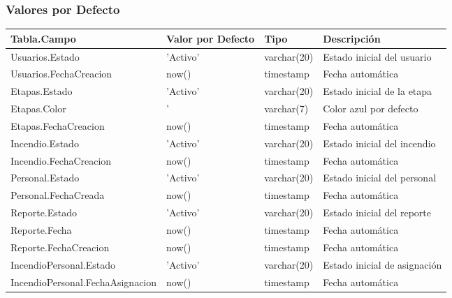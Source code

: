 \subsubsection{Valores por Defecto}
\begin{longtable}{|p{4cm}|p{3cm}|p{3cm}|p{3cm}|}
    \hline
    \textbf{Tabla.Campo} & \textbf{Valor por Defecto} & \textbf{Tipo} & \textbf{Descripción} \\ \hline
    Usuarios.Estado & 'Activo' & varchar(20) & Estado inicial del usuario \\ \hline
    Usuarios.FechaCreacion & now() & timestamp & Fecha automática \\ \hline
    Etapas.Estado & 'Activo' & varchar(20) & Estado inicial de la etapa \\ \hline
    Etapas.Color & '#007bff' & varchar(7) & Color azul por defecto \\ \hline
    Etapas.FechaCreacion & now() & timestamp & Fecha automática \\ \hline
    Incendio.Estado & 'Activo' & varchar(20) & Estado inicial del incendio \\ \hline
    Incendio.FechaCreacion & now() & timestamp & Fecha automática \\ \hline
    Personal.Estado & 'Activo' & varchar(20) & Estado inicial del personal \\ \hline
    Personal.FechaCreada & now() & timestamp & Fecha automática \\ \hline
    Reporte.Estado & 'Activo' & varchar(20) & Estado inicial del reporte \\ \hline
    Reporte.Fecha & now() & timestamp & Fecha automática \\ \hline
    Reporte.FechaCreacion & now() & timestamp & Fecha automática \\ \hline
    IncendioPersonal.Estado & 'Activo' & varchar(20) & Estado inicial de asignación \\ \hline
    IncendioPersonal.FechaAsignacion & now() & timestamp & Fecha automática \\ \hline
\end{longtable} 
